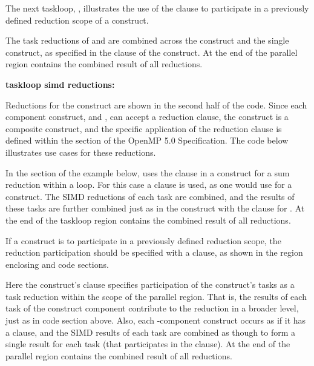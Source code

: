 The next taskloop, , illustrates the use of the 
 clause to participate in a previously defined
reduction scope of a  construct.

The task reductions of  and  are combined
across the  construct and the single  construct, as specified
in the  clause of the  construct.
At the end of the parallel region  contains the combined result of all reductions.

\textbf{taskloop simd reductions:}

Reductions for the  construct are shown in the second half of the code.
Since each component construct,  and , 
can accept a reduction clause, the  construct
is a composite construct, and the specific application of the reduction clause is defined
within the  section of the OpenMP 5.0 Specification.
The code below illustrates use cases for these reductions.

In the  section of the example below,
 uses the  clause 
in a  construct for a sum reduction within a loop.
For this case a  clause is used, as one would use 
for a  construct.
The SIMD reductions of each task are combined, and the results of these tasks are further 
combined just as in the  construct with the  clause for .
At the end of the taskloop region  contains the combined result of all reductions.

If a  construct is to participate in a previously defined 
reduction scope, the reduction participation should be specified with
a  clause, as shown in the  region enclosing
 and  code sections.  

Here the  construct's 
 clause specifies participation of the construct's tasks as 
a task reduction within the scope of the parallel region.  
That is, the results of each task of the  construct component 
contribute to the reduction in a broader level, just as in  code section above.
Also, each -component construct
occurs as if it has a  clause, and the
SIMD results of each task are combined as though to form a single result for
each task (that participates in the  clause).
At the end of the parallel region  contains the combined result of all reductions.


